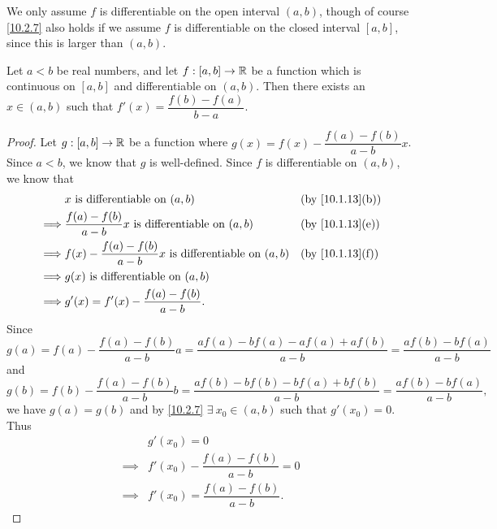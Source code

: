 \begin{rmk}\label{10.2.8}
  We only assume \(f\) is differentiable on the open interval \((a, b)\), though of course \cref{10.2.7} also holds if we assume \(f\) is differentiable on the closed interval \([a, b]\), since this is larger than \((a, b)\).
\end{rmk}

\begin{cor}\label{10.2.9}
  Let \(a < b\) be real numbers, and let \(f : [a, b] \to \mathbb{R}\) be a function which is continuous on \([a, b]\) and differentiable on \((a, b)\).
  Then there exists an \(x \in (a, b)\) such that \(f'(x) = \dfrac{f(b) - f(a)}{b - a}\).
\end{cor}

\begin{proof}
  Let \(g : [a, b] \to \mathbb{R}\) be a function where \(g(x) = f(x) - \dfrac{f(a) - f(b)}{a - b} x\).
  Since \(a < b\), we know that \(g\) is well-defined.
  Since \(f\) is differentiable on \((a, b)\), we know that
  \begin{align*}
             & x \text{ is differentiable on } (a, b)                                   &  & \text{(by \cref{10.1.13}(b))} \\
    \implies & \dfrac{f(a) - f(b)}{a - b} x \text{ is differentiable on } (a, b)        &  & \text{(by \cref{10.1.13}(e))} \\
    \implies & f(x) - \dfrac{f(a) - f(b)}{a - b} x \text{ is differentiable on } (a, b) &  & \text{(by \cref{10.1.13}(f))} \\
    \implies & g(x) \text{ is differentiable on } (a, b)                                                                   \\
    \implies & g'(x) = f'(x) - \dfrac{f(a) - f(b)}{a - b}.
  \end{align*}
  Since
  \[
    g(a) = f(a) - \dfrac{f(a) - f(b)}{a - b} a = \dfrac{af(a) - bf(a) - af(a) + af(b)}{a - b} = \dfrac{af(b) - bf(a)}{a - b}
  \]
  and
  \[
    g(b) = f(b) - \dfrac{f(a) - f(b)}{a - b} b = \dfrac{af(b) - bf(b) - bf(a) + bf(b)}{a - b} = \dfrac{af(b) - bf(a)}{a - b},
  \]
  we have \(g(a) = g(b)\) and by \cref{10.2.7} \(\exists\ x_0 \in (a, b)\) such that \(g'(x_0) = 0\).
  Thus
  \begin{align*}
             & g'(x_0) = 0                              \\
    \implies & f'(x_0) - \dfrac{f(a) - f(b)}{a - b} = 0 \\
    \implies & f'(x_0) = \dfrac{f(a) - f(b)}{a - b}.
  \end{align*}
\end{proof}

